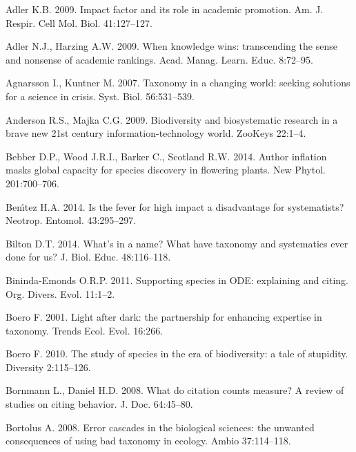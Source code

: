 \documentclass[webpdf,PV,mynatbib,surname,CE,MSC]{SYS-PV}
\begin{document}
\begin{thebibliography}{}

Adler K.B. 2009. Impact factor and its role in academic promotion. Am. J. Respir. Cell Mol. Biol.
41:127--127.

Adler N.J., Harzing A.W. 2009. When knowledge wins: transcending the sense and nonsense of
academic rankings. Acad. Manag. Learn. Educ. 8:72--95.

Agnarsson I., Kuntner M. 2007. Taxonomy in a changing world: seeking solutions for a science in
crisis. Syst. Biol. 56:531--539.

Anderson R.S., Majka C.G. 2009. Biodiversity and biosystematic research in a brave new 21st
century information-technology world. ZooKeys 22:1--4.

Bebber D.P., Wood J.R.I., Barker C., Scotland R.W. 2014. Author inflation masks global capacity
for species discovery in flowering plants. New Phytol. 201:700--706.

Ben\'{\i}tez H.A. 2014. Is the fever for high impact a disadvantage for systematists? Neotrop.
Entomol. 43:295--297.

Bilton D.T. 2014. What's in a name? What have taxonomy and systematics ever done for us? J. Biol.
Educ. 48:116--118.

Bininda-Emonds O.R.P. 2011. Supporting species in ODE: explaining and citing. Org. Divers. Evol.
11:1--2.

Boero F. 2001. Light after dark: the partnership for enhancing expertise in taxonomy. Trends Ecol.
Evol. 16:266.

Boero F. 2010. The study of species in the era of biodiversity: a tale of stupidity. Diversity
2:115--126.

Bornmann L., Daniel H.D. 2008. What do citation counts measure? A review of studies on citing
behavior. J. Doc. 64:45--80.

Bortolus A. 2008. Error cascades in the biological sciences: the unwanted consequences of using
bad taxonomy in ecology. Ambio 37:114--118.


\end{thebibliography}
\end{document}
